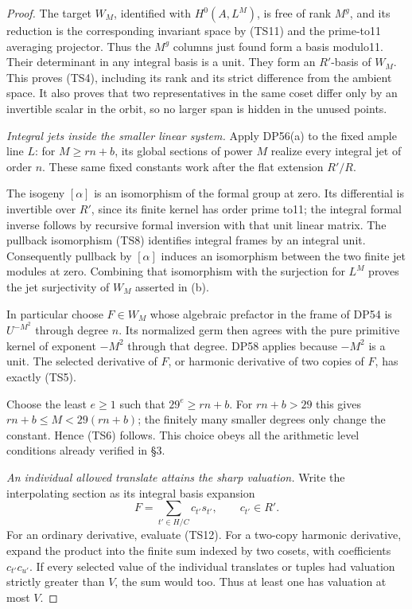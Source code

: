 \begin{proof}
The target \(W_M\), identified with \(H^0(A,L^M)\), is free of rank \(M^g\), and its reduction is the corresponding invariant space by (TS11) and the prime-to11 averaging projector. Thus the \(M^g\) columns just found form a basis modulo11. Their determinant in any integral basis is a unit. They form an \(R'\)-basis of \(W_M\). This proves (TS4), including its rank and its strict difference from the ambient space. It also proves that two representatives in the same coset differ only by an invertible scalar in the orbit, so no larger span is hidden in the unused points.

\emph{Integral jets inside the smaller linear system.}
Apply DP56(a) to the fixed ample line \(L\): for \(M\ge rn+b\), its global sections of power \(M\) realize every integral jet of order \(n\). These same fixed constants work after the flat extension \(R'/R\).

The isogeny \([\alpha]\) is an isomorphism of the formal group at zero. Its differential is invertible over \(R'\), since its finite kernel has order prime to11; the integral formal inverse follows by recursive formal inversion with that unit linear matrix. The pullback isomorphism (TS8) identifies integral frames by an integral unit. Consequently pullback by \([\alpha]\) induces an isomorphism between the two finite jet modules at zero. Combining that isomorphism with the surjection for \(L^M\) proves the jet surjectivity of \(W_M\) asserted in (b).

In particular choose \(F\in W_M\) whose algebraic prefactor in the frame of DP54 is \(U^{-M^2}\) through degree \(n\). Its normalized germ then agrees with the pure primitive kernel of exponent \(-M^2\) through that degree. DP58 applies because \(-M^2\) is a unit. The selected derivative of \(F\), or harmonic derivative of two copies of \(F\), has exactly (TS5).

Choose the least \(e\ge1\) such that \(29^e\ge rn+b\). For \(rn+b>29\) this gives \(rn+b\le M<29(rn+b)\); the finitely many smaller degrees only change the constant. Hence (TS6) follows. This choice obeys all the arithmetic level conditions already verified in §3.

\emph{An individual allowed translate attains the sharp valuation.}
Write the interpolating section as its integral basis expansion \[
 F=\sum_{t'\in H/C}c_{t'}s_{t'},\qquad c_{t'}\in R'.
 \tag{TS12}
\] For an ordinary derivative, evaluate (TS12). For a two-copy harmonic derivative, expand the product into the finite sum indexed by two cosets, with coefficients \(c_{t'}c_{u'}\). If every selected value of the individual translates or tuples had valuation strictly greater than \(V\), the sum would too. Thus at least one has valuation at most \(V\).


\end{proof}
